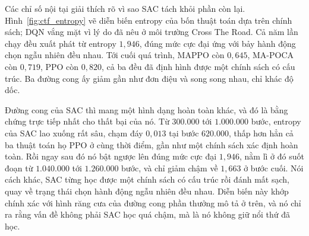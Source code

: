 \indent Các chỉ số nội tại giải thích rõ vì sao SAC tách khỏi phần còn lại.
Hình~\ref{fig:ctf_entropy} vẽ diễn biến entropy của bốn thuật toán dựa trên chính sách;
DQN vắng mặt vì lý do đã nêu ở môi trường Cross The Road. Cả năm lần chạy đều xuất phát từ
entropy $1{,}946$, đúng mức cực đại ứng với bảy hành động chọn ngẫu nhiên đều nhau. Tới
cuối quá trình, MAPPO còn $0{,}645$, MA-POCA còn $0{,}719$, PPO còn $0{,}820$, cả ba đều đã
định hình được một chính sách có cấu trúc. Ba đường cong ấy giảm gần như đơn điệu và
song song nhau, chỉ khác độ dốc.

\indent Đường cong của SAC thì mang một hình dạng hoàn toàn khác, và đó là bằng chứng
trực tiếp nhất cho thất bại của nó. Từ $300.000$ tới $1.000.000$ bước, entropy của SAC lao xuống
rất sâu, chạm đáy $0{,}013$ tại bước $620.000$, thấp hơn hẳn cả
ba thuật toán họ PPO ở cùng thời điểm, gần như một chính sách xác định hoàn toàn. Rồi ngay
sau đó nó bật ngược lên đúng mức cực đại $1{,}946$, nằm lì ở đó suốt đoạn từ $1.040.000$ tới
$1.260.000$ bước, và chỉ giảm chậm về
$1{,}663$ ở bước cuối. Nói cách khác, SAC từng học được một chính sách có cấu trúc rồi
đánh mất sạch, quay về trạng thái chọn hành động ngẫu nhiên đều nhau. Diễn biến này khớp
chính xác với hình răng cưa của đường cong phần thưởng mô tả ở trên, và nó chỉ ra rằng vấn
đề không phải SAC học quá chậm, mà là nó không giữ nổi thứ đã học.

